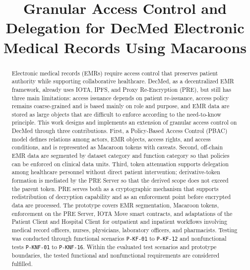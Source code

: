 \documentclass[conference,a4paper,english]{IEEEtran}
\begin{document}
\title{Granular Access Control and Delegation for DecMed Electronic Medical Records Using Macaroons}

\author{
} 
\maketitle

\begin{abstract}
	Electronic medical records (EMRs) require access control that preserves patient authority while supporting collaborative healthcare. DecMed, as a decentralized EMR framework, already uses IOTA, IPFS, and Proxy Re-Encryption (PRE), but still has three main limitations: access issuance depends on patient re-issuance, access policy remains coarse-grained and is based mainly on role and purpose, and EMR data are stored as large objects that are difficult to enforce according to the need-to-know principle. This work designs and implements an extension of granular access control on DecMed through three contributions. First, a Policy-Based Access Control (PBAC) model defines relations among actors, EMR objects, access rights, and access conditions, and is represented as Macaroon tokens with caveats. Second, off-chain EMR data are segmented by dataset category and function category so that policies can be enforced on clinical data units. Third, token attenuation supports delegation among healthcare personnel without direct patient intervention; derivative-token formation is mediated by the PRE Server so that the derived scope does not exceed the parent token. PRE serves both as a cryptographic mechanism that supports redistribution of decryption capability and as an enforcement point before encrypted data are processed. The prototype covers EMR segmentation, Macaroon tokens, enforcement on the PRE Server, IOTA Move smart contracts, and adaptations of the Patient Client and Hospital Client for outpatient and inpatient workflows involving medical record officers, nurses, physicians, laboratory officers, and pharmacists. Testing was conducted through functional scenarios \texttt{P-KF-01} to \texttt{P-KF-12} and nonfunctional tests \texttt{P-KNF-01} to \texttt{P-KNF-16}. Within the evaluated test scenarios and prototype boundaries, the tested functional and nonfunctional requirements are considered fulfilled.
\end{abstract}
\end{document}
